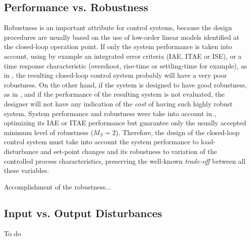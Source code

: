 \subsection{Performance vs. Robustness}


Robustness is an important attribute for control systems, because the design procedures are usually based on the use of low-order linear models identified at the closed-loop operation point. If only the system performance is taken into account, using by example an integrated error criteria (IAE, ITAE or ISE), or a time response characteristic (overshoot, rise-time or settling-time for example), as in \cite{Huang2002, Tavakoli2003}, the resulting closed-loop control system probably will have a very poor robustness.  On the other hand, if the system is designed to have good robustness, as in \cite{Hagglund2008}, and if the performance of the resulting system is not evaluated, the designer will not have any indication of the \emph{cost} of having such highly robust system.  System performance and robustness were take into account in \cite{Shen2002, Tavakoli2005}, optimizing its IAE or ITAE performance but guarantee only the usually accepted minimum level of robustness ($M_S=2$). Therefore, the design of the closed-loop control system must take into account the system performance to load-disturbance and set-point changes and its robustness to variation of the controlled process characteristics, preserving the well-known \emph{trade-off} between all these variables.



Accomplishment of the robustness...


\subsection{Input vs. Output Disturbances}
To do